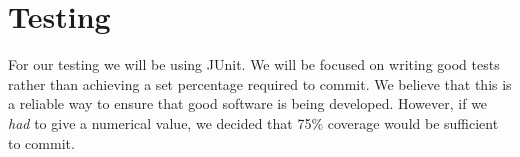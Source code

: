 \section{Testing}

For our testing we will be using JUnit. We will be focused on writing good tests rather than achieving a set percentage required to commit. We believe that this is a reliable way to ensure that good software is being developed. However, if we \textit{had} to give a numerical value, we decided that 75\% coverage would be sufficient to commit.



